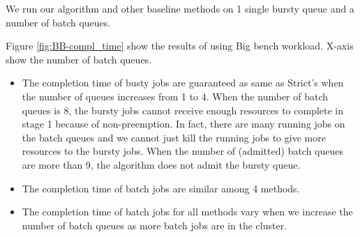 We run our algorithm and other baseline methods on 1 single bursty queue and a number of batch queues.

Figure \ref{fig:BB-compl_time} show the results of using Big bench workload. X-axis show the number of batch queues.
\begin{itemize}
\item The completion time of busty jobs are guaranteed as same as Strict's when the number of queues increases from 1 to 4. When the number of batch queues is 8, the bursty jobs cannot receive enough resources to complete in stage 1 because of non-preemption. In fact, there are many running jobs on the batch queues and we cannot just kill the running jobs to give more resources to the bursty jobs. When the number of (admitted) batch queues are more than 9, the algorithm does not admit the bursty queue.
\item The completion time of batch jobs are similar among 4 methods.
\item The completion time of batch jobs for all methods vary when we increase the number of batch queues as more batch jobs are in the cluster.
\end{itemize}

